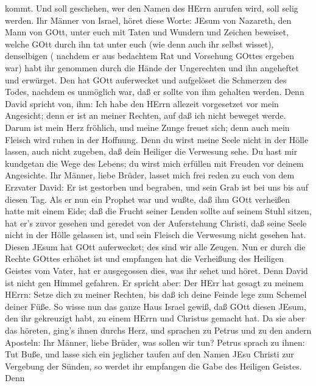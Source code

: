 kommt.  Und soll geschehen, wer den Namen des HErrn anrufen
wird, soll selig werden.  Ihr Männer von Israel, höret
diese Worte: JEsum von Nazareth, den Mann von GOtt, unter euch mit Taten
und Wundern und Zeichen beweiset, welche GOtt durch ihn tat unter euch
(wie denn auch ihr selbst wisset),  denselbigen ( nachdem
er aus bedachtem Rat und Vorsehung GOttes ergeben war) habt ihr genommen
durch die Hände der Ungerechten und ihn angeheftet und erwürget.
 Den hat GOtt auferwecket und aufgelöset die Schmerzen des
Todes, nachdem es unmöglich war, daß er sollte von ihm gehalten werden.
 Denn David spricht von, ihm: Ich habe den HErrn allezeit
vorgesetzet vor mein Angesicht; denn er ist an meiner Rechten, auf daß
ich nicht beweget werde.  Darum ist mein Herz fröhlich, und
meine Zunge freuet sich; denn auch mein Fleisch wird ruhen in der
Hoffnung.  Denn du wirst meine Seele nicht in der Hölle
lassen, auch nicht zugeben, daß dein Heiliger die Verwesung sehe.
 Du hast mir kundgetan die Wege des Lebens; du wirst mich
erfüllen mit Freuden vor deinem Angesichte.  Ihr Männer,
liebe Brüder, lasset mich frei reden zu euch von dem Erzvater David: Er
ist gestorben und begraben, und sein Grab ist bei uns bis auf diesen
Tag.  Als er nun ein Prophet war und wußte, daß ihm GOtt
verheißen hatte mit einem Eide; daß die Frucht seiner Lenden sollte auf
seinem Stuhl sitzen,  hat er's zuvor gesehen und geredet
von der Auferstehung Christi, daß seine Seele nicht in der Hölle
gelassen ist, und sein Fleisch die Verwesung nicht gesehen hat.
 Diesen JEsum hat GOtt auferwecket; des sind wir alle
Zeugen.  Nun er durch die Rechte GOttes erhöhet ist und
empfangen hat die Verheißung des Heiligen Geistes vom Vater, hat er
ausgegossen dies, was ihr sehet und höret.  Denn David ist
nicht gen Himmel gefahren. Er spricht aber: Der HErr hat gesagt zu
meinem HErrn: Setze dich zu meiner Rechten,  bis daß ich
deine Feinde lege zum Schemel deiner Füße.  So wisse nun
das ganze Haus Israel gewiß, daß GOtt diesen JEsum, den ihr gekreuzigt
habt, zu einem HErrn und Christus gemacht hat.  Da sie aber
das höreten, ging's ihnen durchs Herz, und sprachen zu Petrus und zu den
andern Aposteln: Ihr Männer, liebe Brüder, was sollen wir tun?
 Petrus sprach zu ihnen: Tut Buße, und lasse sich ein
jeglicher taufen auf den Namen JEsu Christi zur Vergebung der Sünden, so
werdet ihr empfangen die Gabe des Heiligen Geistes.  Denn
